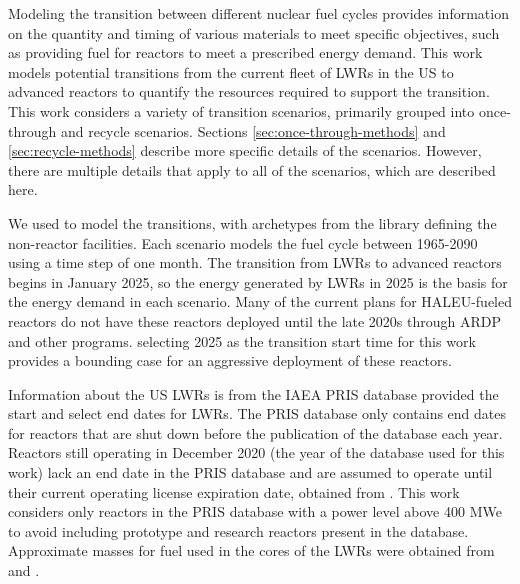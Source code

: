 Modeling the transition between different nuclear fuel cycles provides 
information on the quantity and timing of various materials to meet 
specific objectives, such as providing fuel for reactors to meet a 
prescribed energy demand. 
This work models potential transitions from the 
current fleet of \glspl{LWR} in the US to advanced reactors to quantify the 
resources required to support the transition. 
This work considers a variety of transition scenarios, primarily grouped 
into once-through and recycle scenarios. Sections \ref{sec:once-through-methods}
and \ref{sec:recycle-methods} describe more specific details of the 
scenarios. However, there are multiple details that apply to all of 
the scenarios, which are described here. 

We used \Cyclus \cite{huff_fundamental_2016} to model the transitions, 
with archetypes from the \Cycamore library \cite{carlsen_cycamore_2014}
defining the non-reactor facilities. Each scenario models the fuel 
cycle between 1965-2090 using a time step of one month. 
The transition from \glspl{LWR} 
to advanced reactors begins in January 2025, so the energy generated by 
\glspl{LWR} in 2025 is the basis for the energy demand in each scenario.  
Many of the 
current plans for \gls{HALEU}-fueled reactors do not have these reactors 
deployed until the late 2020s \cite{nichol_current_2021} through \gls{ARDP} 
and other programs. selecting 2025 as the transition 
start time for this work provides a bounding case for 
an aggressive deployment of these reactors. 

Information about the US \glspl{LWR} is from the \gls{IAEA} \gls{PRIS} 
database \cite{noauthor_power_1989} provided the start and select end 
dates for \glspl{LWR}. The \gls{PRIS} database only contains end dates 
for reactors that are shut down before the publication of the 
database each year. Reactors still operating in December 2020  
(the year of the database used for this work) lack an end date 
in the \gls{PRIS} database and are assumed to operate until 
their current operating license expiration date, obtained from 
\cite{nuclear_energy_institute_us_2021}. This work considers only 
reactors in the \gls{PRIS} database with a power level above 400 MWe 
to avoid including prototype and research reactors present in the database. 
Approximate masses for fuel used in the cores of the \glspl{LWR} were obtained 
from \cite{todreas_nuclear_2012} and \cite{cacuci_handbook_2010}. 

